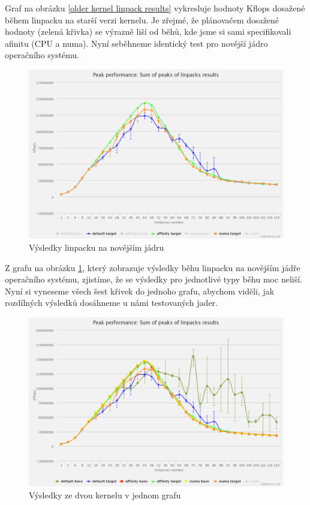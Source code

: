 \documentclass[a4paper,12pt]{article}
\begin{document}
Graf na obrázku \ref{older kernel linpack results} vykresluje hodnoty Kflops dosažené během linpacku na starší verzi kernelu. Je zřejmé, že plánovačem dosažené hodnoty (zelená křivka) se výrazně liší od běhů, kde jsme si sami specifikovali afinitu (CPU a numa). Nyní seběhneme identický test pro novější jádro operačního systému.

\begin{figure}[ht]
\center
\includegraphics[scale=0.16]{obrazky/LinpackTargetChart.png}
\caption{Výsledky linpacku na novějším jádru}
\label{newer kernel linpack results}
\end{figure}

Z grafu na obrázku \ref{newer kernel linpack results}, který zobrazuje výsledky běhu linpacku na novějším jádře operačního systému,  zjistíme, že se výsledky pro jednotlivé typy běhu moc neliší. Nyní si vyneseme všech šest křivek do jednoho grafu, abychom viděli, jak rozdílných výsledků dosáhneme u námi testovaných jader. 

\begin{figure}[ht]
\center
\includegraphics[scale=0.2]{obrazky/LinpackSumChart.png}
\caption{Výsledky ze dvou kernelu v jednom grafu}
\label{both kernels linpack results}
\end{figure}
\end{document}
